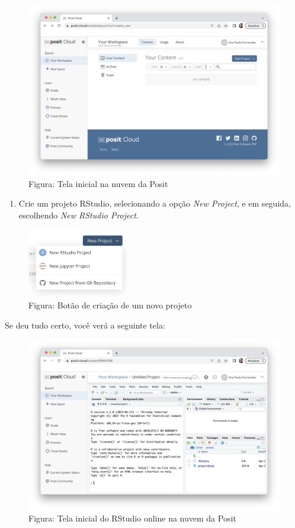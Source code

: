 \documentclass[
]{book}
\providecommand{\tightlist}{%
  \setlength{\itemsep}{0pt}\setlength{\parskip}{0pt}}
\begin{document}
\begin{figure}
\centering
\includegraphics{telaPosit.png}
\caption{Figura: Tela inicial na nuvem da Posit}
\end{figure}

\begin{enumerate}
\def\labelenumi{\arabic{enumi}.}
\setcounter{enumi}{3}
\tightlist
\item
  Crie um projeto RStudio, selecionando a opção \emph{New Project}, e em seguida, escolhendo \emph{New RStudio Project}.
\end{enumerate}

\begin{figure}
\centering
\includegraphics[width=0.4\textwidth,height=\textheight]{telaCriarProjetoRStudio.png}
\caption{Figura: Botão de criação de um novo projeto}
\end{figure}

Se deu tudo certo, você verá a seguinte tela:

\begin{figure}
\centering
\includegraphics{telaRStudioPosit.png}
\caption{Figura: Tela inicial do RStudio online na nuvem da Posit}
\end{figure}
\end{document}
